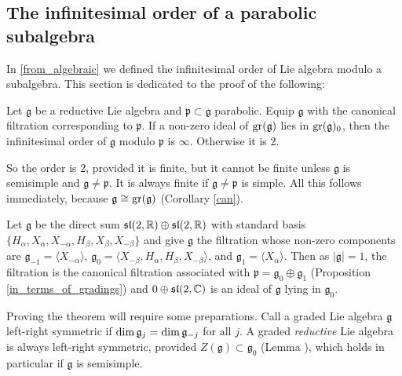 \documentclass[leqno,12pt]{amsart} %
\begin{document}
\subsection{The infinitesimal order of a parabolic subalgebra}\label{parabolic_order}
In \ref{from_algebraic} we defined the {\df infinitesimal order} of Lie algebra modulo a
subalgebra. This section is dedicated to the proof of the following:
\begin{theorem}
  Let ${\mathfrak g} $ be a reductive Lie algebra and ${\mathfrak p}\subset {\mathfrak g}$
  parabolic. Equip ${\mathfrak g} $ with the canonical filtration corresponding to
  ${\mathfrak p} $. If a non-zero ideal of $\operatorname{\operatorname{gr}}({\mathfrak g})$ lies in
  $\operatorname{\operatorname{gr}}({\mathfrak g})_0$, then the infinitesimal order of ${\mathfrak g} $ modulo
  ${\mathfrak p} $ is $\infty$. Otherwise it is 2.
\end{theorem}
\noindent%
So the order is 2, provided it is finite, but it cannot be finite unless ${\mathfrak g} $
is semisimple and ${\mathfrak g} \ne {\mathfrak p}$. It is always finite if
${\mathfrak g}\ne {\mathfrak p}$ is simple. All this follows immediately, because
${\mathfrak g} \cong \operatorname{\operatorname{gr}}({\mathfrak g})$ (Corollary \ref{can}).


\begin{example}
  Let ${\mathfrak g}$ be the direct sum
  $\mathfrak{sl}(2, {\mathbb R})\oplus \mathfrak{sl}(2, {\mathbb R})$ with standard
  basis $\{H_\alpha, X_\alpha, X_{-\alpha}, H_\beta, X_\beta, X_{-\beta}\}$ and give
  ${\mathfrak g} $ the filtration whose non-zero components are
  ${\mathfrak g}_{-1}=\langle X_{-\alpha}\rangle$,
  ${\mathfrak g}_0=\langle X_{-\beta},H_\alpha,H_\beta,X_{-\beta}\rangle$, and
  ${\mathfrak g}_1=\langle X_\alpha\rangle$. Then as $|{\mathfrak g}| = 1$, the filtration
  is the canonical filtration associated with
  ${\mathfrak p} = {\mathfrak g}_0 \oplus {\mathfrak g}_1$ (Proposition
  \ref{in_terms_of_gradings}) and $0 \oplus \mathfrak{sl}(2, {\mathbb C})$ is an ideal of
  ${\mathfrak g} $ lying in ${\mathfrak g}_0$.
\end{example}

Proving the theorem will require some preparations. Call a graded Lie algebra
${\mathfrak g}$ {\df left-right symmetric} if
$\operatorname{dim} {\mathfrak g}_j=\operatorname{dim} {\mathfrak g}_{-j}$ for all $j$. A graded {\em
  reductive} Lie algebra is always left-right symmetric, provided
$Z({\mathfrak g}) \subset {\mathfrak g}_0$ (Lemma ), which holds in
particular if ${\mathfrak g} $ is semisimple.
\end{document}
